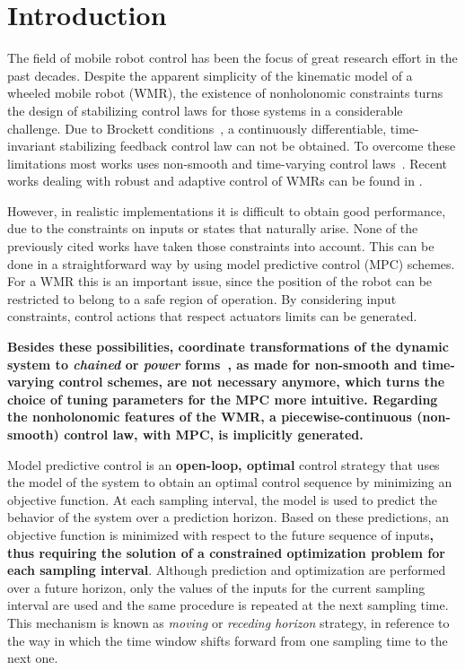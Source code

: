 \documentclass[conference]{IEEEtran} %
\begin{document}
\section{Introduction}
\label{sec:intro}

The field of mobile robot control has been the focus of great research
effort in the past decades. Despite the apparent simplicity of the kinematic
model of a wheeled mobile robot (WMR), the existence of nonholonomic
constraints turns the design of stabilizing control laws for those systems
in a considerable challenge. Due to Brockett conditions~\cite{brockett82}, a
continuously differentiable, time-invariant stabilizing feedback control law
can not be obtained. To overcome these limitations most works uses
non-smooth and time-varying control
laws~\cite{bloch89,samson91,canudas92,yamamoto94,murray97}. Recent works
dealing with robust and adaptive control of WMRs can be found in
\cite{oya03,dixon04}.

However, in realistic implementations it is difficult to obtain good
performance, due to the constraints on inputs or states that naturally
arise. None of the previously cited works have taken those constraints
into account. This can be done in a straightforward way by using model
predictive control (MPC) schemes. For a WMR this is an important issue,
since the position of the robot can be restricted to belong to a safe
region of operation. By considering input constraints, control actions that
respect actuators limits can be generated. 

{\bf Besides these possibilities, coordinate transformations of the dynamic system to {\em chained} or {\em power} forms~\cite{bloch89}, as made for non-smooth and time-varying control schemes, are not necessary anymore, which turns the choice of tuning parameters for the MPC more intuitive. Regarding the nonholonomic features of the WMR, a piecewise-continuous (non-smooth) control law, with MPC, is implicitly generated.}

Model predictive control is an {\bf open-loop, optimal} control strategy that uses the model of the
system to obtain an optimal control sequence by minimizing an objective
function. At each sampling interval, the model is used to predict the behavior of the system over a prediction horizon. Based on these predictions, an objective
function is minimized with respect to the future sequence of inputs{\bf , thus requiring the solution of a constrained optimization problem for each sampling interval}. Although prediction and optimization are performed over a future
horizon, only the values of the inputs for the current sampling interval are
used and the same procedure is repeated at the next sampling time. This
mechanism is known as {\it moving} or {\it receding horizon} strategy, in
reference to the way in which the time window shifts forward from one sampling time
to the next one.
\end{document}
